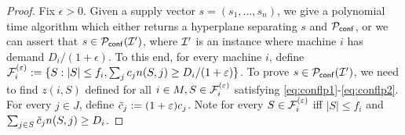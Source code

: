 \begin{proof}
	Fix $\epsilon> 0$.
	Given a supply vector $s = (s_1,\ldots,s_n)$, we give a polynomial time algorithm which either returns a hyperplane separating $s$ and ${\cal P}_\mathsf{conf}$, or we can assert that
	$s\in {\cal P}_\mathsf{conf}({\cal I}')$, where ${\cal I}'$ is an instance where machine $i$ has demand $D_i/(1+\epsilon)$. To this end, for every machine $i$, define ${\cal F}^{(\varepsilon)}_i := \{S: |S| \leq f_i,  \sum_j c_jn(S,j)\geq D_i/(1+\varepsilon) \}$. To prove $s\in {\cal P}_\mathsf{conf}({\cal I}')$, we need to find $z(i,S)$ defined for all $i\in M, S\in {\cal F}^{(\varepsilon)}_i$ satisfying \eqref{eq:conflp1}-\eqref{eq:conflp2}.
	For every $j\in J$, define $\tilde{c}_j := (1+\varepsilon)c_j$. Note for every $S\in {\cal F}^{(\varepsilon)}_i$ iff $|S| \leq f_i$ and  $\sum_{j\in S} \tilde{c}_j n(S,j) \geq D_i$.
	

\end{proof}
